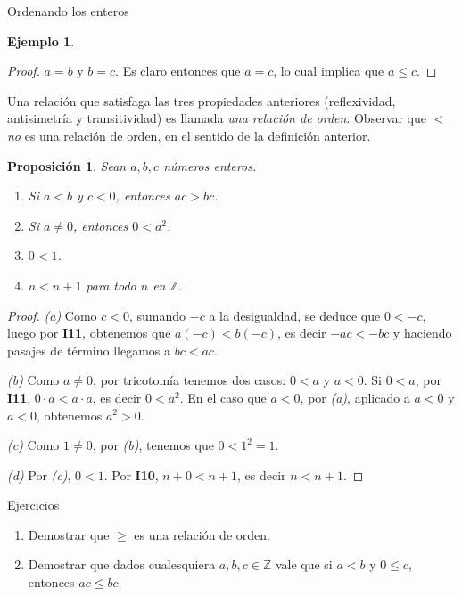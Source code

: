 \documentclass[11pt,spanish,makeidx]{amsbook}
\newtheorem{proposicion}[teorema]{Proposici\'on}
\theoremstyle{definition}
\newtheorem{ejemplo}{Ejemplo}[section]
\theoremstyle{remark}
\begin{document}
\begin{section}{Ordenando los enteros}
\begin{ejemplo}
\begin{proof}
$a=b$ y $b=c$. Es claro entonces que $a=c$, lo cual implica que $a\le c$.
\end{proof}
\end{ejemplo}

Una relación que satisfaga las tres propiedades anteriores (reflexividad, antisimetría y transitividad) es llamada {\em una relación de orden}. Observar que $<$ {\em no} es una relación de orden, en el sentido de la definición anterior. 

\begin{proposicion}\label{prop-0-menor-1} Sean $a,b,c$ números enteros. 
	\begin{enumerate}
		\item[{\it (a)}] Si  $a < b$ y $c < 0$, entonces $ac > bc$.
		\item[{\it (b)}] Si $a \ne 0$, entonces  $0 < a^2$. 
		\item[{\it (c)}] \label{item-0-menor-1} $0 < 1$.
		\item[{\it (d)}] $n < n+1$ para todo $n$ en $\mathbb Z$.
	\end{enumerate}
\end{proposicion}
\begin{proof}
	{\it (a)} Como $c < 0$, sumando $-c$ a la desigualdad, se deduce que $0 < -c$, luego por {\bf I11}, obtenemos que $a(-c) < b(-c)$, es decir $-ac < -bc$ y haciendo pasajes de término llegamos a $bc < ac$. 
	
	{\it (b)} Como $a \ne 0$, por tricotomía tenemos dos casos: $ 0<a$  y $a <0$. Si $0 < a$, por {\bf I11}, $0 \cdot a < a \cdot a$,  es decir $0 < a^2$. En  el caso que $a <0$, por {\it (a)}, aplicado a $a<0$ y $a<0$, obtenemos $a^2 >0$.
	
	{\it (c)} Como $1 \ne 0$, por {\it (b)}, tenemos que $0 < 1^2 = 1$.
	
	{\it (d)} Por {\it (c)}, $0 < 1$. Por  {\bf I10}, $n + 0 < n + 1$, es decir  $n < n+1$.
\end{proof}

\begin{subsection}{Ejercicios}\label{ejerciciosorden}
\begin{enumerate}
\item Demostrar que $\ge$ es una relación de orden.
\item Demostrar que dados cualesquiera $a,b,c \in \mathbb Z$ vale que si $a< b$ y $0\le c$, entonces $ac \le bc$. 
\end{enumerate}
\end{subsection}


\end{section}
\end{document}

